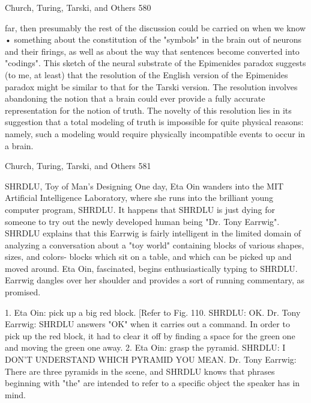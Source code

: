 {Church, Turing, Tarski, and Others                                                        580

far, then presumably the rest of the discussion could be carried on when we know •
something about the constitution of the "symbols" in the brain out of neurons and their
firings, as well as about the way that sentences become converted into "codings".
         This sketch of the neural substrate of the Epimenides paradox suggests (to me, at
least) that the resolution of the English version of the Epimenides paradox might be
similar to that for the Tarski version. The resolution involves abandoning the notion that
a brain could ever provide a fully accurate representation for the notion of truth. The
novelty of this resolution lies in its suggestion that a total modeling of truth is impossible
for quite physical reasons: namely, such a modeling would require physically
incompatible events to occur in a brain.




Church, Turing, Tarski, and Others                                                        581

                                    SHRDLU,
                             Toy of Man's Designing
         One day, Eta Oin wanders into the MIT Artificial Intelligence Laboratory,
         where she runs into the brilliant young computer program, SHRDLU. It
         happens that SHRDLU is just dying for someone to try out the newly
         developed human being "Dr. Tony Earrwig". SHRDLU explains that this
         Earrwig is fairly intelligent in the limited domain of analyzing a conversation
         about a "toy world" containing blocks of various shapes, sizes, and colors-
         blocks which sit on a table, and which can be picked up and moved around.
         Eta Oin, fascinated, begins enthusiastically typing to SHRDLU. Earrwig
         dangles over her shoulder and provides a sort of running commentary, as
         promised.

1. Eta Oin: pick up a big red block. [Refer to Fig. 110.
   SHRDLU: OK.
        Dr. Tony Earrwig: SHRDLU answers "OK" when it carries out a command. In order
          to pick up the red block, it had to clear it off by finding a space for the green one
          and moving the green one away.
2. Eta Oin: grasp the pyramid.
   SHRDLU: I DON'T UNDERSTAND WHICH PYRAMID YOU MEAN.
   Dr. Tony Earrwig: There are three pyramids in the scene, and SHRDLU knows that
   phrases beginning with "the" are intended to refer to a specific object the speaker has in
   mind.

}
